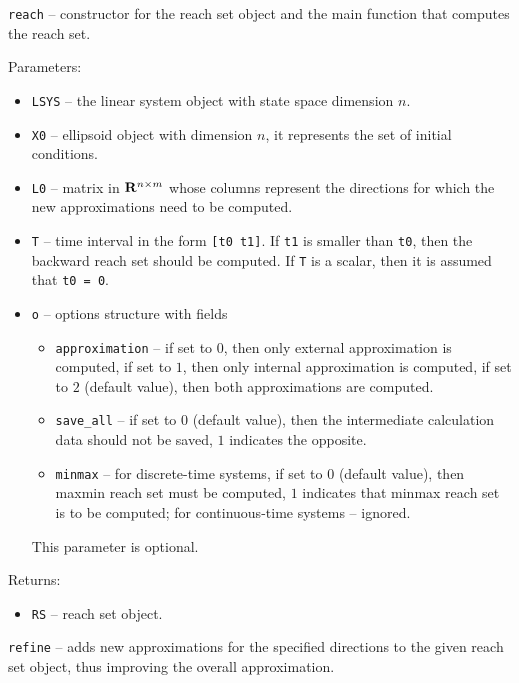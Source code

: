 \newpage

{\Large {\tt reach}} -- constructor for the reach set object and the main
function that computes the reach set.

Parameters:
\begin{itemize}
\item {\tt LSYS} -- the linear system object with state space dimension $n$.
\item {\tt X0} -- ellipsoid object with dimension $n$, it represents
the set of initial conditions.
\item {\tt L0} -- matrix in ${\bf R}^{n\times m}$ whose columns represent the
directions for which the new approximations need to be computed.
\item {\tt T} -- time interval in the form {\tt [t0 t1]}. If {\tt t1} is
smaller than {\tt t0}, then the backward reach set should be computed.
If {\tt T} is a scalar, then it is assumed that {\tt t0 = 0}.
\item {\tt o} -- options structure with fields
\begin{itemize}
\item {\tt approximation} -- if set to $0$, then only external approximation
is computed, if set to $1$, then only internal approximation is computed,
if set to $2$ (default value), then both approximations are computed.
\item {\tt save\_all} -- if set to $0$ (default value), then the intermediate
calculation data should not be saved, $1$ indicates the opposite.
\item {\tt minmax} -- for discrete-time systems, if set to $0$ (default value),
then maxmin reach set must be computed, $1$ indicates that minmax reach set is
to be computed; for continuous-time systems -- ignored.
\end{itemize}
This parameter is optional.
\end{itemize}

Returns:
\begin{itemize}
\item {\tt RS} -- reach set object.
\end{itemize}

\newpage

{\Large {\tt refine}} -- adds new approximations for the specified directions
to the given reach set object, thus improving the overall approximation.

